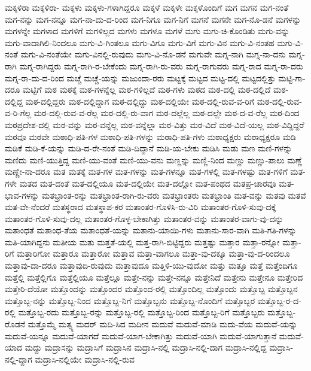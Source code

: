 {ಮಕ್ಕಳಿರಾ
ಮಕ್ಕಳಿರಾ-
ಮಕ್ಕಳು
ಮಕ್ಕಳು-ಗಳಾಗಿದ್ದರೂ
ಮಕ್ಕಳೆ
ಮಕ್ಕಳೇ
ಮಕ್ಕಳೊಂದಿಗೆ
ಮಗ
ಮಗನ
ಮಗ-ನಂತೆ
ಮಗ-ನನ್ನು
ಮಗ-ನನ್ನೂ
ಮಗ-ನಾ-ದು-ದ-ರಿಂದ
ಮಗ-ನಿಗೂ
ಮಗ-ನಿಗೆ
ಮಗನೆ
ಮಗನೇ
ಮಗ-ನೊ-ಡನೆ
ಮಗಳನ್ನು
ಮಗಳನ್ನೇ
ಮಗಳಾದ
ಮಗಳಿಗೆ
ಮಗಳಿಲ್ಲದ
ಮಗಳು
ಮಗಳೂ
ಮಗಳೆ
ಮಗು
ಮಗು-ಚಿ-ಕೊಂಡಿತು
ಮಗು-ವನ್ನು
ಮಗು-ವಾದಾಗಿಲಿ-ನಿಂದಲೂ
ಮಗು-ವಿ-ಗಿಂತಲೂ
ಮಗು-ವಿಗೂ
ಮಗು-ವಿಗೆ
ಮಗು-ವಿನ
ಮಗು-ವಿ-ನಂತಹ
ಮಗು-ವಿ-ನಂತೆ
ಮಗು-ವಿ-ನಂತೆಯೇ
ಮಗು-ವಿನಲ್ಲಿ-ರುವುದು
ಮಗು-ವಿ-ನೊ-ಡನೆ
ಮಗುವೇ
ಮಗ್ನ-ನಾಗಿ
ಮಗ್ನ-ನಾ-ದನು
ಮಗ್ನ-ರಾಗಿ
ಮಗ್ನ-ರಾಗಿದ್ದರು
ಮಗ್ನ-ರಾಗಿ-ರ-ಬೇಕೆಂದು
ಮಗ್ನ-ರಾಗಿ-ರು-ವರು
ಮಗ್ನ-ರಾಗುವರು
ಮಗ್ನ-ರಾದ
ಮಗ್ನ-ರಾ-ದರು
ಮಗ್ನ-ರಾ-ದು-ದ-ರಿಂದ
ಮಚ್ಚೆ
ಮಚ್ಚೆ-ಯನ್ನು
ಮಜುಂದಾ-ರರು
ಮಟ್ಟಕ್ಕೆ
ಮಟ್ಟದ
ಮಟ್ಟ-ದಲ್ಲಿ
ಮಟ್ಟದಲ್ಲಿತ್ತು
ಮಟ್ಟಿ-ಗಾ-ದರೂ
ಮಟ್ಟಿಗೆ
ಮಠ
ಮಠಕ್ಕೆ
ಮಠ-ಗಳನ್ನೆಲ್ಲ
ಮಠ-ಗಳಿಲ್ಲದೆ
ಮಠ-ಗಳು
ಮಠದ
ಮಠ-ದಲ್ಲಿ
ಮಠ-ದಲ್ಲಿದೆ
ಮಠ-ದಲ್ಲಿದ್ದ
ಮಠ-ದಲ್ಲಿದ್ದರು
ಮಠ-ದಲ್ಲಿದ್ದಾಗ
ಮಠ-ದಲ್ಲಿದ್ದು
ಮಠ-ದಲ್ಲಿಯೇ
ಮಠ-ದಲ್ಲಿ-ರುವ-ವ-ರಿಗೆ
ಮಠ-ದಲ್ಲಿ-ರುವ-ವ-ರಿ-ಗೆಲ್ಲ
ಮಠ-ದಲ್ಲಿ-ರುವ-ವ-ರೆಲ್ಲ
ಮಠ-ದಲ್ಲಿ-ರು-ವಾಗ
ಮಠ-ದಲ್ಲೆಲ್ಲ
ಮಠ-ದಲ್ಲೇ
ಮಠ-ದ-ವ-ರೆಲ್ಲ
ಮಠ-ದಿಂದ
ಮಠಪ್ರದೇಶ-ದಲ್ಲಿ
ಮಠ-ವನ್ನು
ಮಠ-ವನ್ನೆಲ್ಲ
ಮಠ-ವನ್ನೆಲ್ಲಾ
ಮಠ-ವಿತ್ತು
ಮಠ-ವಿದೆ
ಮಠ-ವಿದೆ-ಯಲ್ಲ
ಮಠ-ವಿದ್ದಿದ್ದರೆ
ಮಠವೂ
ಮಠವೇ
ಮಠಾಧಿ-ಪತಿ-ಗಳ
ಮಠಾಧಿ-ಪತಿ-ಗಳನ್ನು
ಮಠಾಧಿ-ಪತಿ-ಗಳು
ಮಠಾಧ್ಯಕ್ಷರು
ಮಠಾಧ್ಯಕ್ಷರೂ
ಮಡಿ
ಮಡಿಕೆ
ಮಡಿ-ಕೆ-ಯನ್ನು
ಮಡಿ-ದ-ರೇ-ನಂತೆ
ಮಡಿ-ದಿದ್ದಾನೆ
ಮಡಿ-ಯ-ಬೇಕು
ಮಡಿಸಿ
ಮಡು
ಮಣ
ಮಣಿ-ಗಳನ್ನು
ಮಣಿದು
ಮಣಿ-ಯುತ್ತಿದ್ದ
ಮಣಿ-ಯು-ವಂತೆ
ಮಣಿ-ಯು-ವನು
ಮಣ್ಣನ್ನು
ಮಣ್ಣಿ-ನಿಂದ
ಮಣ್ಣು
ಮಣ್ಣು-ಪಾಲು
ಮಣ್ಣೆ
ಮಣ್ಣೇ-ನಾ-ದರೂ
ಮತ
ಮತಕ್ಕೆ
ಮತ-ಗಳ
ಮತ-ಗಳನ್ನು
ಮತ-ಗಳನ್ನೂ
ಮತ-ಗಳಲ್ಲಿ
ಮತ-ಗಳಷ್ಟು
ಮತ-ಗಳಿಗೆ
ಮತ-ಗಳೇ
ಮತದ
ಮತ-ದಂತೆ
ಮತ-ದಲ್ಲಿಯೂ
ಮತ-ದಲ್ಲಿಯೇ
ಮತ-ದಲ್ಲೋ
ಮತ-ಪಂಥದ
ಮತಪ್ರ-ಚಾರವೂ
ಮತ-ಭಾವ-ಗಳನ್ನು
ಮತಭ್ರಾಂತ-ರನ್ನು
ಮತಭ್ರಾಂತ-ರಾಗಿ-ರು-ವರು
ಮತಭ್ರಾಂತರು
ಮತಭ್ರಾಂತಿ
ಮತ-ವನ್ನು
ಮತವು
ಮತವೆ
ಮತ-ವೇ-ನೆಂದರೆ
ಮತಸ್ಥರಾದ
ಮತಸ್ಥಾಪ-ಕರ
ಮತಾಂತರ-ಗೊಳಿಸಿ-ರು-ವಿರಿ
ಮತಾಂತರ-ಗೊಳಿ-ಸುವು-ದಕ್ಕೆ
ಮತಾಂತರ-ಗೊಳಿ-ಸುವು-ದಲ್ಲ
ಮತಾಂತರ-ಗೊಳ್ಳ-ಬೇಕಾಗಿತ್ತು
ಮತಾಂತರ-ವನ್ನು
ಮತಾಂತರ-ವಾಗು-ವು-ದನ್ನು
ಮತಾಂಧತೆ
ಮತಾಂಧ-ತೆಯ
ಮತಾಂಧತೆ-ಯನ್ನು
ಮತಾನು-ಯಾಯಿ-ಗಳು
ಮತಾನು-ಸಾರ-ವಾಗಿ
ಮತಿ-ಗತಿ-ಗಳನ್ನು
ಮತಿ-ಯಾಗಿದ್ದನು
ಮತೀಯ
ಮತು
ಮತ್ತತೆ-ಯಲ್ಲಿ
ಮತ್ತ-ರಾಗಿ-ಬಿಟ್ಟಿದ್ದರು
ಮತ್ತಷ್ಟು
ಮತ್ತಾರ
ಮತ್ತಾ-ರನ್ನೋ
ಮತ್ತಾ-ರಿಗೆ
ಮತ್ತಾರಿಗೋ
ಮತ್ತಾರೂ
ಮತ್ತಾರೋ
ಮತ್ತಾವ
ಮತ್ತಾ-ವಾಗಲೂ
ಮತ್ತಾ-ವು-ದಕ್ಕೂ
ಮತ್ತಾ-ವು-ದ-ರಿಂದಲೂ
ಮತ್ತಾವು-ದಾ-ದರೂ
ಮತ್ತಾವುದಿ-ರುವುದು
ಮತ್ತಾವುದೂ
ಮತ್ತಿಳಿ-ಯು-ವುದೋ
ಮತ್ತು
ಮತ್ತೂ
ಮತ್ತೆ
ಮತ್ತೆಂದಿಗೂ
ಮತ್ತೆಲ್ಲಿ
ಮತ್ತೆಲ್ಲಿಗೊ
ಮತ್ತೆಲ್ಲಿಯೂ
ಮತ್ತೆಲ್ಲೂ
ಮತ್ತೇ-ನನ್ನು
ಮತ್ತೇ-ನನ್ನೂ
ಮತ್ತೇನಿದೆ
ಮತ್ತೇನು
ಮತ್ತೇನೂ
ಮತ್ತೇರಿದ
ಮತ್ತೇರಿ-ದೆಯೋ
ಮತ್ತೊಂದನ್ನು
ಮತ್ತೊಂದರ
ಮತ್ತೊಂದ-ರಲ್ಲಿ
ಮತ್ತೊಂದಿಲ್ಲ
ಮತ್ತೊಂದು
ಮತ್ತೊಬ್ಬ
ಮತ್ತೊಬ್ಬನ
ಮತ್ತೊಬ್ಬ-ನನ್ನು
ಮತ್ತೊಬ್ಬ-ನಿಂದ
ಮತ್ತೊಬ್ಬ-ನಿಗೆ
ಮತ್ತೊಬ್ಬನು
ಮತ್ತೊಬ್ಬ-ನೊಂದಿಗೆ
ಮತ್ತೊಬ್ಬರ
ಮತ್ತೊಬ್ಬ-ರ-ದ-ರಲ್ಲಿ
ಮತ್ತೊಬ್ಬ-ರದು
ಮತ್ತೊಬ್ಬ-ರನ್ನು
ಮತ್ತೊಬ್ಬ-ರಲ್ಲಿ
ಮತ್ತೊಬ್ಬ-ರಿಂದ
ಮತ್ತೊಬ್ಬ-ರಿಗೆ
ಮತ್ತೊಬ್ಬರು
ಮತ್ತೊಬ್ಬ-ರೊಡನೆ
ಮತ್ತೊಮ್ಮೆ
ಮತ್ಸ್ಯ
ಮದರ್
ಮದಿ-ಸಿದ
ಮದೀನ
ಮದುವೆ
ಮದುವೆ-ಮಾಡಿ
ಮದು-ವೆಯ
ಮದುವೆ-ಯನ್ನು
ಮದುವೆ-ಯನ್ನೂ
ಮದುವೆ-ಯಾಗದೆ
ಮದುವೆ-ಯಾಗ-ಬೇಕಾಗಿತ್ತು
ಮದುವೆ-ಯಾಗಿ
ಮದುವೆ-ಯಾಗುತ್ತಾನೆ
ಮದುವೆ-ಯಾದ
ಮದ್ದು
ಮದ್ರಾಸನ್ನು
ಮದ್ರಾಸಿಗೆ
ಮದ್ರಾಸಿನ
ಮದ್ರಾಸಿ-ನಲ್ಲಿ
ಮದ್ರಾಸಿ-ನಲ್ಲಿ-ದಾಗ
ಮದ್ರಾಸಿ-ನಲ್ಲಿದ್ದ
ಮದ್ರಾಸಿ-ನಲ್ಲಿ-ದ್ದಾಗ
ಮದ್ರಾಸಿ-ನಲ್ಲಿಯೇ
ಮದ್ರಾಸಿ-ನಲ್ಲಿ-ರುವ
}
